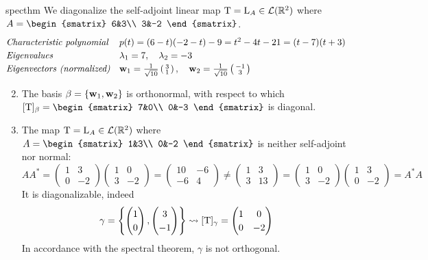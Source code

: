 \pagebreak[3]


\begin{examples}{}{specthm}
	\exstart We diagonalize the self-adjoint linear map $\mathrm{T}=\mathrm{L}_A\in\mathcal{L}(\mathbb{R}^2)$ where $A=
	\begin{smatrix}
		6&3\\
		3&-2
	\end{smatrix}$.
	\[
		\def\arraystretch{1.2}
		\begin{array}{@{}ll}
			\text{\emph{Characteristic polynomial}} &p(t)=(6-t)(-2-t)-9=t^2-4t-21=(t-7)(t+3)\\
			\text{\emph{Eigenvalues}} &\lambda_1=7,\quad \lambda_2=-3\\
			\text{\emph{Eigenvectors (normalized)}} &\vw_1=\frac 1{\sqrt{10}}\stwovec{3}{1},\quad \vw_2=\frac 1{\sqrt{10}}\stwovec{-1}{3}
		\end{array}
	\]
	\begin{enumerate}\setcounter{enumi}{1}
		\item[]	The basis $\beta=\{{\mathbf{w}}_1,{\mathbf{w}}_2\}$ is orthonormal, with respect to which $[\rT]_\beta=
		\begin{smatrix}
			7&0\\
			0&-3
		\end{smatrix}$
		is diagonal.
		
	  \item\label{ex:schur1} The map $\mathrm{T}=\mathrm{L}_A\in\mathcal{L}(\mathbb{R}^2)$ where $A=
	  \begin{smatrix}
			1&3\\
			0&-2
		\end{smatrix}$
		is neither self-adjoint nor normal:
		\[
			AA^*=
			\begin{pmatrix}
				1&3\\
				0&-2
			\end{pmatrix}
			\begin{pmatrix}
				1&0\\
				3&-2
			\end{pmatrix}
			=
			\begin{pmatrix}
				10&-6\\
				-6&4
			\end{pmatrix}
			\neq
			\begin{pmatrix}
				1&3\\
				3&13
			\end{pmatrix}
			=
			\begin{pmatrix}
				1&0\\
				3&-2
			\end{pmatrix}
			\begin{pmatrix}
				1&3\\
				0&-2
			\end{pmatrix}
			=A^*A
		\]
		It is diagonalizable, indeed
		\[
		\gamma=\left\{\twovec 10,\twovec 3{-1}\right\} \rightsquigarrow [\rT]_\gamma=
		\begin{pmatrix}
			1&0\\
			0&-2
		\end{pmatrix}
		\]
		In accordance with the spectral theorem, $\gamma$ is not orthogonal.
		

\end{enumerate}
\end{examples}
